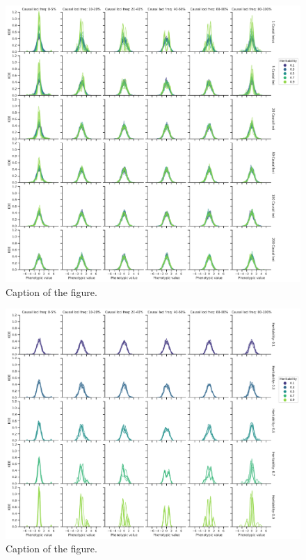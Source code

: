 \documentclass{article}
\begin{document}
\begin{figure}[b]
    \centering
    \includegraphics[width=1\textwidth]{figures/phenotypes_initial-3.pdf}
    \caption{Caption of the figure.}
    \label{fig:phenotypes_initial}
\end{figure}

\begin{figure}[b]
    \centering
    \includegraphics[width=1\textwidth]{figures/phenotypes_initial_onlymonogenic-2.pdf}
    \caption{Caption of the figure.}
    \label{fig:phenotypes_initial_mono}
\end{figure}
\end{document}
